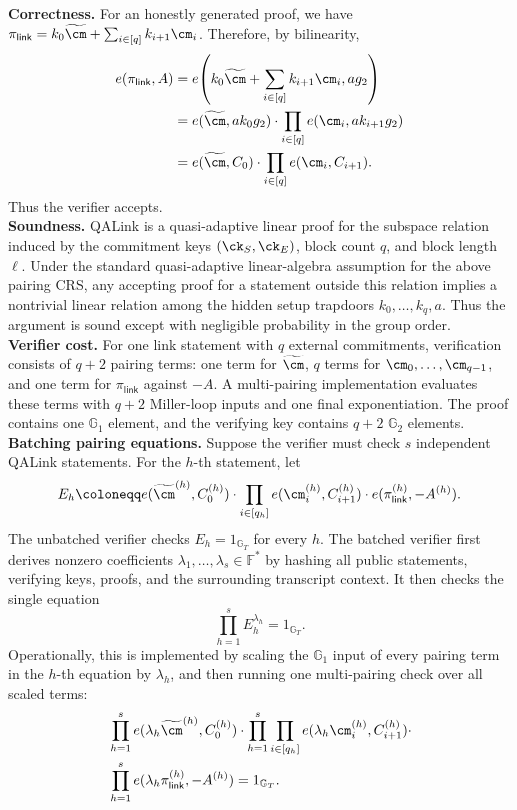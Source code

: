 \noindent\textbf{Correctness.}
For an honestly generated proof, we have
\(\pi_{\mathsf{link}}=k_0\widetilde{\cm}+\sum_{i\in[q]}k_{i+1}\cm_i\).
Therefore, by bilinearity,
\[
\begin{aligned}
  e(\pi_{\mathsf{link}},A)
  &=
  e\!\left(k_0\widetilde{\cm}+\sum_{i\in[q]}k_{i+1}\cm_i,ag_2\right)
  \\
  &=
  e(\widetilde{\cm},ak_0g_2)
  \cdot
  \prod_{i\in[q]} e(\cm_i,ak_{i+1}g_2)
  \\
  &=
  e(\widetilde{\cm},C_0)
  \cdot
  \prod_{i\in[q]} e(\cm_i,C_{i+1}).
\end{aligned}
\]
Thus the verifier accepts. \\

\noindent\textbf{Soundness.}
QALink is a quasi-adaptive linear proof for the subspace relation induced by
the commitment keys \((\ck_S,\ck_E)\), block count \(q\), and block length
\(\ell\).  Under the standard quasi-adaptive linear-algebra assumption for the
above pairing CRS, any accepting proof for a statement outside this relation
implies a nontrivial linear relation among the hidden setup trapdoors
\(k_0,\ldots,k_q,a\).  Thus the argument is sound except with negligible
probability in the group order. \\

\noindent\textbf{Verifier cost.}
For one link statement with \(q\) external commitments, verification consists
of \(q+2\) pairing terms:
one term for \(\widetilde{\cm}\), \(q\) terms for
\(\cm_0,\ldots,\cm_{q-1}\), and one term for \(\pi_{\mathsf{link}}\) against
\(-A\).  A multi-pairing implementation evaluates these terms with \(q+2\)
Miller-loop inputs and one final exponentiation.  The proof contains one
\(\mathbb{G}_1\) element, and the verifying key contains \(q+2\)
\(\mathbb{G}_2\) elements. \\

\noindent\textbf{Batching pairing equations.}
Suppose the verifier must check \(s\) independent QALink statements.  For the
\(h\)-th statement, let
\[
  E_h
  \coloneqq
  e(\widetilde{\cm}^{(h)},C^{(h)}_0)
  \cdot
  \prod_{i\in[q_h]} e(\cm^{(h)}_i,C^{(h)}_{i+1})
  \cdot
  e(\pi^{(h)}_{\mathsf{link}},-A^{(h)}).
\]
The unbatched verifier checks \(E_h=1_{\mathbb{G}_T}\) for every \(h\).  The
batched verifier first derives nonzero coefficients
\(\lambda_1,\ldots,\lambda_s\in\mathbb{F}^{\ast}\) by hashing all public
statements, verifying keys, proofs, and the surrounding transcript context.  It
then checks the single equation
\[
  \prod_{h=1}^{s} E_h^{\lambda_h}=1_{\mathbb{G}_T}.
\]
Operationally, this is implemented by scaling the \(\mathbb{G}_1\) input of
every pairing term in the \(h\)-th equation by \(\lambda_h\), and then running
one multi-pairing check over all scaled terms:
\[
\begin{aligned}
  &\prod_{h=1}^{s}
  e(\lambda_h\widetilde{\cm}^{(h)},C^{(h)}_0)
  \cdot
  \prod_{h=1}^{s}\prod_{i\in[q_h]}
  e(\lambda_h\cm^{(h)}_i,C^{(h)}_{i+1})
  \cdot \\
  &\prod_{h=1}^{s}
  e(\lambda_h\pi^{(h)}_{\mathsf{link}},-A^{(h)})
  =
  1_{\mathbb{G}_T}.
\end{aligned}
\]

